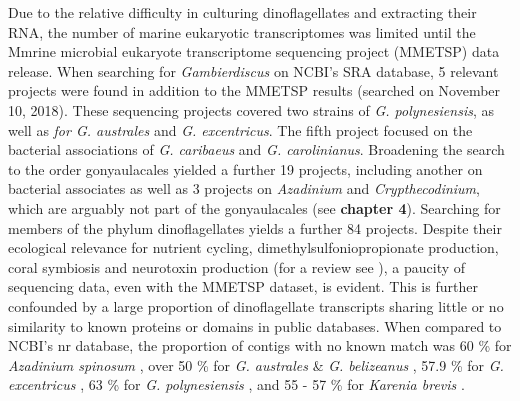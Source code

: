 \documentclass[12pt]{article}
\begin{document}
Due to the relative difficulty in culturing dinoflagellates and extracting their RNA, the number of marine eukaryotic transcriptomes was limited until the Mmrine microbial eukaryote transcriptome sequencing project (MMETSP) data release. 
When searching for \textit{Gambierdiscus} on NCBI's SRA database, 5 relevant projects were found in addition to the MMETSP results (searched on November 10, 2018). 
These sequencing projects covered two strains of \textit{G. polynesiensis}, as well as \textit{for G. australes} and \textit{G. excentricus}. 
The fifth project focused on the bacterial associations of \textit{G. caribaeus} and \textit{G. carolinianus}.
Broadening the search to the order gonyaulacales yielded a further 19 projects, including another on bacterial associates as well as 3 projects on \textit{Azadinium} and \textit{Crypthecodinium}, which are arguably not part of the gonyaulacales (see \textbf{chapter 4}). 
Searching for members of the phylum dinoflagellates yields a further 84 projects. 
Despite their ecological relevance for nutrient cycling, dimethylsulfoniopropionate production, coral symbiosis and neurotoxin production (for a review see \cite{murray2016unravelling}), a paucity of sequencing data, even with the MMETSP dataset, is evident. 
This is further confounded by a large proportion of dinoflagellate transcripts sharing little or no similarity to known proteins or domains in public databases. 
When compared to NCBI's nr database, the proportion of contigs with no known match was 60 \% for \textit{Azadinium spinosum} \cite{meyer2015transcriptomic}, over 50 \% for \textit{G. australes} \& \textit{G. belizeanus} \cite{kohli2015polyketide}, 57.9 \% for \textit{G. excentricus} \cite{kohli2017role}, 63 \% for \textit{G. polynesiensis} \cite{kohli2017role,pawlowiez2014transcriptome}, and 55 - 57 \% for \textit{Karenia brevis} \cite{ryan2014novo}. 



\end{document}
